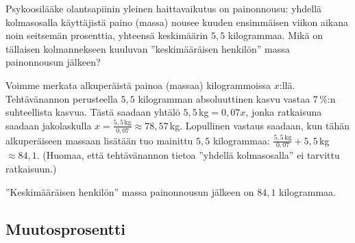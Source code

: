 
\begin{esimerkki}
Psykoosilääke olantsapiinin yleinen haittavaikutus on painonnousu: yhdellä kolmasosalla käyttäjistä paino (massa) nousee kuuden ensimmäisen viikon aikana noin seitsemän prosenttia, yhteensä keskimäärin $5,5$ kilogrammaa. Mikä on tällaisen kolmannekseen kuuluvan ''keskimääräisen henkilön'' massa painonnousun jälkeen?
	\begin{esimratk}
Voimme merkata alkuperäistä painoa (massaa) kilogrammoissa $x$:llä. Tehtävänannon perusteella $5,5$ kilogramman absoluuttinen kasvu vastaa $7$\,\%:n suhteellista kasvua. Tästä saadaan yhtälö $5,5\,$kg$=0,07x$, jonka ratkaisuna saadaan jakolaskulla $x=\frac{5,5\,\textrm{kg}}{0,07}\approx78,57$\,kg. Lopullinen vastaus saadaan, kun tähän alkuperäiseen massaan lisätään tuo mainittu $5,5$ kilogrammaa: $\frac{5,5\,\textrm{kg}}{0,07}+5,5$\,kg$\approx84,1$. (Huomaa, että tehtävänannon tietoa ''yhdellä kolmasosalla'' ei tarvittu ratkaisuun.)
	\end{esimratk}
    \begin{esimvast}
    ''Keskimääräisen henkilön'' massa painonnousun jälkeen on $84,1$ kilogrammaa.
    \end{esimvast}
\end{esimerkki}


%	


\subsection{Muutosprosentti}

